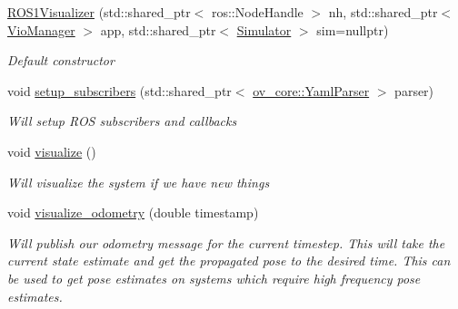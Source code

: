 \begin{DoxyCompactItemize}
\item 
\hyperlink{classov__msckf_1_1ROS1Visualizer_abd76c037fd103010fcdb74d2d9f9e391}{R\+O\+S1\+Visualizer} (std\+::shared\+\_\+ptr$<$ ros\+::\+Node\+Handle $>$ nh, std\+::shared\+\_\+ptr$<$ \hyperlink{classov__msckf_1_1VioManager}{Vio\+Manager} $>$ app, std\+::shared\+\_\+ptr$<$ \hyperlink{classov__msckf_1_1Simulator}{Simulator} $>$ sim=nullptr)
\begin{DoxyCompactList}\small\item\em Default constructor \end{DoxyCompactList}\item 
void \hyperlink{classov__msckf_1_1ROS1Visualizer_a4e2e37124ca201ce654ff0b0b60ad3c2}{setup\+\_\+subscribers} (std\+::shared\+\_\+ptr$<$ \hyperlink{classov__core_1_1YamlParser}{ov\+\_\+core\+::\+Yaml\+Parser} $>$ parser)
\begin{DoxyCompactList}\small\item\em Will setup R\+OS subscribers and callbacks \end{DoxyCompactList}\item 
\mbox{\label{classov__msckf_1_1ROS1Visualizer_af1b81d6404be911527608c6564b031de}} 
void \hyperlink{classov__msckf_1_1ROS1Visualizer_af1b81d6404be911527608c6564b031de}{visualize} ()
\begin{DoxyCompactList}\small\item\em Will visualize the system if we have new things \end{DoxyCompactList}\item 
\mbox{\label{classov__msckf_1_1ROS1Visualizer_ae3f4eb0a391d47c3bd811cb43935b9bc}} 
void \hyperlink{classov__msckf_1_1ROS1Visualizer_ae3f4eb0a391d47c3bd811cb43935b9bc}{visualize\+\_\+odometry} (double timestamp)
\begin{DoxyCompactList}\small\item\em Will publish our odometry message for the current timestep. This will take the current state estimate and get the propagated pose to the desired time. This can be used to get pose estimates on systems which require high frequency pose estimates. \end{DoxyCompactList}\item 
\mbox{\label{classov__msckf_1_1ROS1Visualizer_a08dbac86db9d9e7bfb80a1a10202df9e}} 

\end{DoxyCompactItemize}
